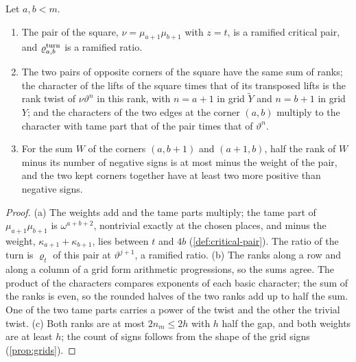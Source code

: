 \begin{lemma}\label{lem:square-chars}
Let $a,b<m$.
\begin{enumerate}[label=\textup{(\alph*)}]
\item The pair of the square, $\nu=\mu_{a+1}\mu_{b+1}$ with $z=t$, is a ramified critical pair, and $\varrho^{\rm turn}_{a,b}$ is a ramified ratio.
\item The two pairs of opposite corners of the square have the same sum of ranks; the character of the lifts of the square times that of its transposed lifts is the rank twist of $\nu\vartheta^n$ in this rank, with $n=a+1$
in grid $\tilde Y$ and $n=b+1$ in grid $Y$; and the characters of the two edges at the corner $(a,b)$ multiply to the character with tame part that of the pair times that of $\vartheta^n$.
\item For the sum $W$ of the corners $(a,b+1)$ and $(a+1,b)$, half the rank of $W$ minus its number of negative signs is at most minus the weight of the pair, and the two kept corners together have at least two more positive than
negative signs.
\end{enumerate}
\end{lemma}

\begin{proof}
(a) The weights add and the tame parts multiply; the tame part of $\mu_{a+1}\mu_{b+1}$ is $\omega^{a+b+2}$, nontrivial exactly at the chosen places, and minus the weight, $\kappa_{a+1}+\kappa_{b+1}$, lies between $t$ and $4b$
(\cref{def:critical-pair}). The ratio of the turn is $\varrho_t$ of this pair at $\vartheta^{j+1}$, a ramified ratio. (b) The ranks along a row and along a column of a grid form arithmetic progressions, so the sums agree. The
product of the characters compares exponents of each basic character; the sum of the ranks is even, so the rounded halves of the two ranks add up to half the sum. One of the two tame parts carries a power of the twist and
the other the trivial twist. (c) Both ranks are at most $2n_m\le2h$ with $h$ half the gap, and both weights are at least $h$; the count of signs follows from the shape of the grid signs (\cref{prop:grids}).
\end{proof}

